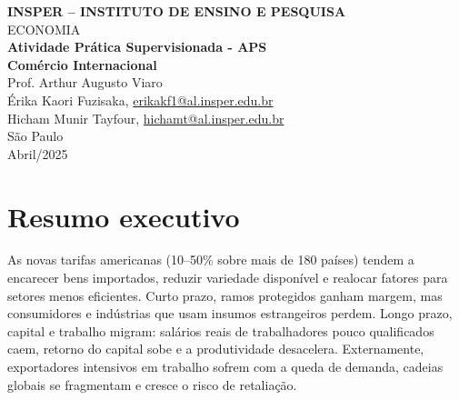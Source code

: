 \documentclass[a4paper,12pt]{article}[abntex2]
\begin{document}
\begin{titlepage}
    \centering
    \vspace*{1cm}
    \Large\textbf{INSPER – INSTITUTO DE ENSINO E PESQUISA}\\
    \Large ECONOMIA\\
    \vspace{1.5cm}
    \Large\textbf{Atividade Prática Supervisionada - APS}\\
    \textbf{Comércio Internacional}\\
    \vspace{1.5cm}
    Prof. Arthur Augusto Viaro\\
    \vfill
    \normalsize
    Érika Kaori Fuzisaka, \href{mailto:erikakf1@al.insper.edu.br}{erikakf1@al.insper.edu.br}\\
    Hicham Munir Tayfour, \href{mailto:hichamt@al.insper.edu.br}{hichamt@al.insper.edu.br}\\

    \vfill
    São Paulo\\
    Abril/2025
\end{titlepage}

\newpage
\tableofcontents
\thispagestyle{empty} %

\newpage 
\listoffigures
\thispagestyle{empty} %

\newpage
\listoftables
\thispagestyle{empty} %

\newpage
\setcounter{page}{1} %
\justify
\onehalfspacing

\section*{\textbf{Resumo executivo}}

As novas tarifas americanas (10–50\% sobre mais de 180 países) tendem a encarecer bens importados, reduzir variedade disponível e realocar fatores para setores menos eficientes.  
Curto prazo, ramos protegidos ganham margem, mas consumidores e indústrias que usam insumos estrangeiros perdem.  
Longo prazo, capital e trabalho migram: salários reais de trabalhadores pouco qualificados caem, retorno do capital sobe e a produtividade desacelera.  
Externamente, exportadores intensivos em trabalho sofrem com a queda de demanda, cadeias globais se fragmentam e cresce o risco de retaliação.
\end{document}
